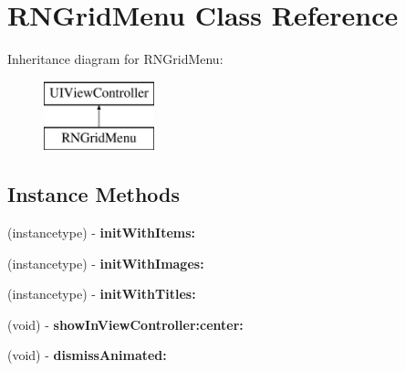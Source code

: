 \hypertarget{interface_r_n_grid_menu}{}\section{R\+N\+Grid\+Menu Class Reference}
\label{interface_r_n_grid_menu}
Inheritance diagram for R\+N\+Grid\+Menu\+:\begin{figure}[H]
\begin{center}
\leavevmode
\includegraphics[height=2.000000cm]{interface_r_n_grid_menu}
\end{center}
\end{figure}
\subsection*{Instance Methods}
\begin{DoxyCompactItemize}
\item 
\hypertarget{interface_r_n_grid_menu_a7e8c53f0d1de34f4ab79fc8363c501cb}{}(instancetype) -\/ {\bfseries init\+With\+Items\+:}\label{interface_r_n_grid_menu_a7e8c53f0d1de34f4ab79fc8363c501cb}

\item 
\hypertarget{interface_r_n_grid_menu_a3b29448d624fbf7ea5a211761f6c3289}{}(instancetype) -\/ {\bfseries init\+With\+Images\+:}\label{interface_r_n_grid_menu_a3b29448d624fbf7ea5a211761f6c3289}

\item 
\hypertarget{interface_r_n_grid_menu_ae256aaa3846108df415ee31ffe3cbdd8}{}(instancetype) -\/ {\bfseries init\+With\+Titles\+:}\label{interface_r_n_grid_menu_ae256aaa3846108df415ee31ffe3cbdd8}

\item 
\hypertarget{interface_r_n_grid_menu_aa460ca2997a3511b228bdcaff3cd64d2}{}(void) -\/ {\bfseries show\+In\+View\+Controller\+:center\+:}\label{interface_r_n_grid_menu_aa460ca2997a3511b228bdcaff3cd64d2}

\item 
\hypertarget{interface_r_n_grid_menu_aa8941a920dd52c32208e63fcfb9b7fb3}{}(void) -\/ {\bfseries dismiss\+Animated\+:}\label{interface_r_n_grid_menu_aa8941a920dd52c32208e63fcfb9b7fb3}

\end{DoxyCompactItemize}
